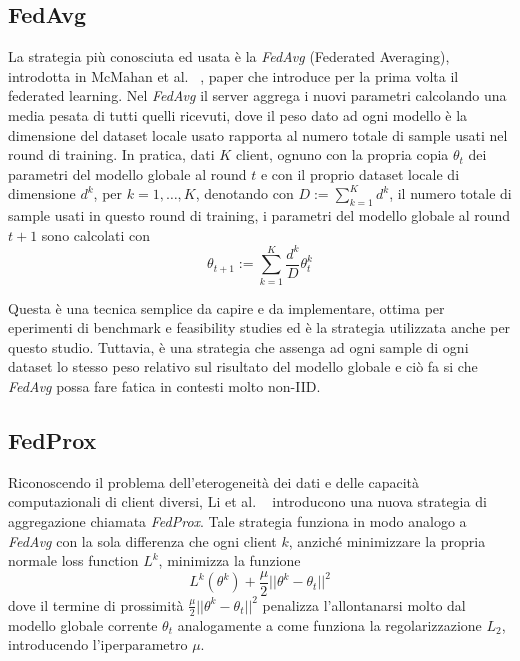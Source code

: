 \subsection{FedAvg}
La strategia più conosciuta ed usata è la \textit{FedAvg} (Federated
Averaging), introdotta in McMahan et al. ~\cite{McMahan2016CommunicationEfficientLO},
paper che introduce per la prima volta il federated learning. Nel 
\textit{FedAvg} il server aggrega i nuovi parametri calcolando una 
media pesata di tutti quelli ricevuti, dove il peso dato ad ogni modello
è la dimensione del dataset locale usato rapporta al numero totale di 
sample usati nel round di training. In pratica, dati \(K\) client,
ognuno con la propria copia \(\theta_t\) dei parametri del modello globale 
al round \(t\) e con il proprio dataset locale di dimensione 
\(d^k\), per \(k = 1, \dots, K\), denotando con 
\(D := \sum_{k=1}^{K} d^k\), il numero totale di sample usati in
questo round di training, i parametri del modello globale al round 
\(t+1\) sono calcolati con 
\[
\theta_{t+1} := \sum_{k=1}^{K} \frac{d^k}{D} \theta_t^k
\]

Questa è una tecnica semplice da capire e da implementare, ottima per 
eperimenti di benchmark e feasibility studies ed è la strategia 
utilizzata anche per questo studio. Tuttavia, è una strategia che 
assenga ad ogni sample di ogni dataset lo stesso peso relativo sul 
risultato del modello globale e ciò fa si che \textit{FedAvg} possa 
fare fatica in contesti molto non-IID.


\subsection{FedProx}
Riconoscendo il problema dell'eterogeneità dei dati e delle capacità 
computazionali di client diversi, Li et al. ~\cite{li2018FederatedOI}
introducono una nuova strategia di aggregazione chiamata 
\textit{FedProx}. Tale strategia funziona in modo analogo a 
\textit{FedAvg} con la sola differenza che ogni client \(k\), anziché 
minimizzare la propria normale loss function \(L^k\), minimizza la 
funzione
\[
L^k(\theta^k) + \frac{\mu}{2} ||\theta^k - \theta_t||^2
\]
dove il termine di prossimità \(\frac{\mu}{2} ||\theta^k - \theta_t||^2\) 
penalizza l'allontanarsi molto dal modello globale corrente
\(\theta_t\) analogamente a come funziona la regolarizzazione \(L_2\),
introducendo l'iperparametro \(\mu\).

